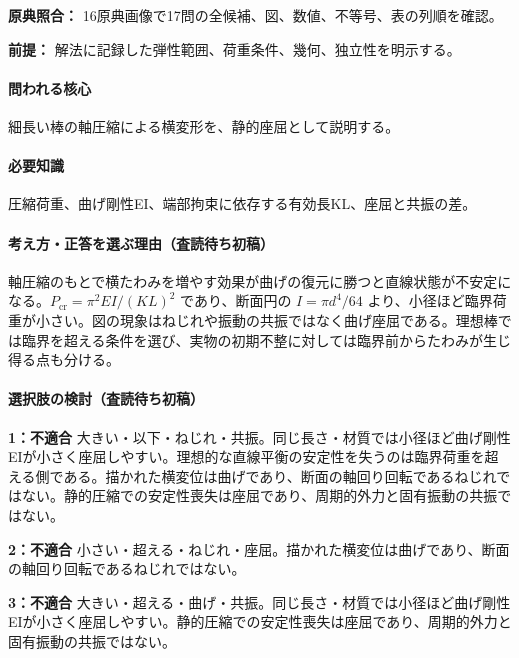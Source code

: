 \noindent\textbf{原典照合：} 16原典画像で17問の全候補、図、数値、不等号、表の列順を確認。\par

\noindent\textbf{前提：} 解法に記録した弾性範囲、荷重条件、幾何、独立性を明示する。\par

\paragraph{問われる核心} 細長い棒の軸圧縮による横変形を、静的座屈として説明する。

\paragraph{必要知識} 圧縮荷重、曲げ剛性EI、端部拘束に依存する有効長KL、座屈と共振の差。

\paragraph{考え方・正答を選ぶ理由（査読待ち初稿）} 軸圧縮のもとで横たわみを増やす効果が曲げの復元に勝つと直線状態が不安定になる。\(P_{\mathrm{cr}}=\pi^2EI/(KL)^2\) であり、断面円の \(I=\pi d^4/64\) より、小径ほど臨界荷重が小さい。図の現象はねじれや振動の共振ではなく曲げ座屈である。理想棒では臨界を超える条件を選び、実物の初期不整に対しては臨界前からたわみが生じ得る点も分ける。

\paragraph{選択肢の検討（査読待ち初稿）}\mbox{}\par

\noindent\textbf{1：不適合} 大きい・以下・ねじれ・共振。同じ長さ・材質では小径ほど曲げ剛性EIが小さく座屈しやすい。理想的な直線平衡の安定性を失うのは臨界荷重を超える側である。描かれた横変位は曲げであり、断面の軸回り回転であるねじれではない。静的圧縮での安定性喪失は座屈であり、周期的外力と固有振動の共振ではない。\par

\noindent\textbf{2：不適合} 小さい・超える・ねじれ・座屈。描かれた横変位は曲げであり、断面の軸回り回転であるねじれではない。\par

\noindent\textbf{3：不適合} 大きい・超える・曲げ・共振。同じ長さ・材質では小径ほど曲げ剛性EIが小さく座屈しやすい。静的圧縮での安定性喪失は座屈であり、周期的外力と固有振動の共振ではない。\par

